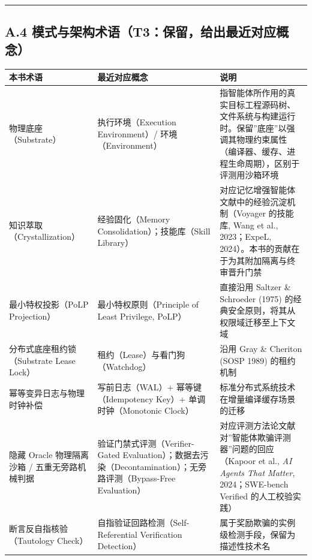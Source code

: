 \begin{center}\rule{0.5\linewidth}{0.5pt}\end{center}

\subsection{A.4
模式与架构术语（T3：保留，给出最近对应概念）}\label{a.4-ux6a21ux5f0fux4e0eux67b6ux6784ux672fux8bedt3ux4fddux7559ux7ed9ux51faux6700ux8fd1ux5bf9ux5e94ux6982ux5ff5}

{\def\LTcaptype{} %
\begin{longtable}[]{@{}
  >{\raggedright\arraybackslash}p{}
  >{\raggedright\arraybackslash}p{}
  >{\raggedright\arraybackslash}p{}@{}}
\toprule\noalign{}
\begin{minipage}[b]{\linewidth}\raggedright
本书术语
\end{minipage} & \begin{minipage}[b]{\linewidth}\raggedright
最近对应概念
\end{minipage} & \begin{minipage}[b]{\linewidth}\raggedright
说明
\end{minipage} \\
\midrule\noalign{}
\endhead
\bottomrule\noalign{}
\endlastfoot
物理底座（Substrate） & 执行环境（Execution Environment）/
环境（Environment） &
指智能体所作用的真实目标工程源码树、文件系统与构建运行时。保留''底座''以强调其物理约束属性（编译器、缓存、进程生命周期），区别于评测用沙箱环境 \\
知识萃取（Crystallization） & 经验固化（Memory
Consolidation）；技能库（Skill Library） &
对应记忆增强智能体文献中的经验沉淀机制（Voyager 的技能库, Wang et al.,
2023；ExpeL, 2024）。本书的贡献在于为其附加隔离与终审晋升门禁 \\
最小特权投影（PoLP Projection） & 最小特权原则（Principle of Least
Privilege, PoLP） & 直接沿用 Saltzer \& Schroeder (1975)
的经典安全原则，将其从权限域迁移至上下文域 \\
分布式底座租约锁（Substrate Lease Lock） &
租约（Lease）与看门狗（Watchdog） & 沿用 Gray \& Cheriton (SOSP 1989)
的租约机制 \\
幂等变异日志与物理时钟补偿 & 写前日志（WAL）+ 幂等键（Idempotency Key）+
单调时钟（Monotonic Clock） &
标准分布式系统技术在增量编译缓存场景的迁移 \\
隐藏 Oracle 物理隔离沙箱 / 五重无旁路机械判据 &
验证门禁式评测（Verifier-Gated
Evaluation）；数据去污染（Decontamination）；无旁路评测（Bypass-Free
Evaluation） &
对应评测方法论文献对''智能体欺骗评测器''问题的回应（Kapoor et al.,
\emph{AI Agents That Matter}, 2024；SWE-bench Verified
的人工校验实践） \\
断言反自指核验（Tautology Check） & 自指验证回路检测（Self-Referential
Verification Detection） &
属于奖励欺骗的实例级检测手段，保留为描述性技术名 \\
\end{longtable}
}

